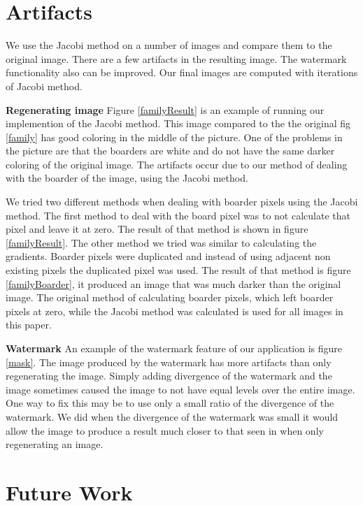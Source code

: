 \documentclass[10pt,twopage]{acmsiggraph}
\begin{document}
\section{Artifacts}

We use the Jacobi method on a number of images and compare them to the original image. There are a few artifacts in the resulting image. The watermark functionality also can be improved. Our final images are computed with \iteration iterations of Jacobi method.

{\bf Regenerating image} Figure \ref{familyResult} is an example of running our implemention of the Jacobi method. This image compared to the the original fig \ref{family} has good coloring in the middle of the picture. One of the problems in the picture are that the boarders are white and do not have the same darker coloring of the original image. The artifacts occur due to our method of dealing with the boarder of the image, using the Jacobi method.

We tried two different methods when dealing with boarder pixels using the Jacobi method. The first method to deal with the board pixel was to not calculate that pixel and leave it at zero. The result of that method is shown in figure \ref{familyResult}. The other method we tried was similar to calculating the gradients. Boarder pixels were duplicated and instead of using adjacent non existing pixels the duplicated pixel was used. The result of that method is figure \ref{familyBoarder}, it produced an image that was much darker than the original image. The original method of calculating boarder pixels, which left boarder pixels at zero, while the Jacobi method was calculated is used for all images in this paper.

{\bf Watermark} An example of the watermark feature of our application is figure \ref{mask}. The image produced by the watermark has more artifacts than only regenerating the image. Simply adding divergence of the watermark and the image sometimes caused the image to not have equal levels over the entire image. One way to fix this may be to use only a small ratio of the divergence of the watermark. We did when the divergence of the watermark was small it would allow the image to produce a result much closer to that seen in when only regenerating an image.

\section{Future Work}
\end{document}
